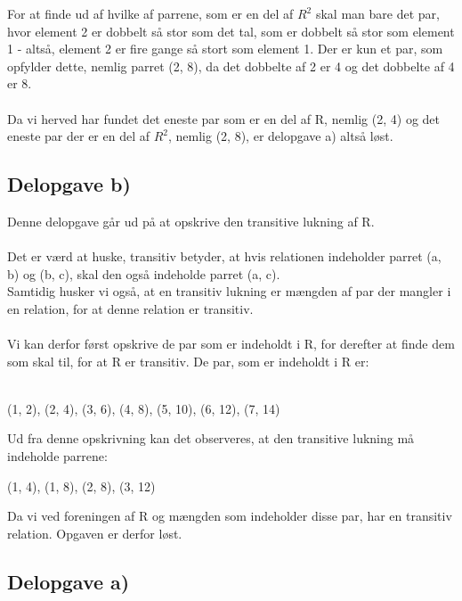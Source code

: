 \documentclass{article}
\begin{document}
For at finde ud af hvilke af parrene, som er en del af $R^2$ skal man bare det par, hvor element 2 er dobbelt så stor som det tal, som er dobbelt så stor som element 1 - altså, element 2 er fire gange så stort som element 1. Der er kun et par, som opfylder dette, nemlig parret (2, 8), da det dobbelte af 2 er 4 og det dobbelte af 4 er 8. \\ \\

Da vi herved har fundet det eneste par som er en del af R, nemlig (2, 4) og det eneste par der er en del af $R^2$, nemlig (2, 8), er delopgave a) altså løst.

\subsection{Delopgave b)}
Denne delopgave går ud på at opskrive den transitive lukning af R. \\ \\

Det er værd at huske, transitiv betyder, at hvis relationen indeholder parret (a, b) og (b, c), skal den også indeholde parret (a, c). \\ Samtidig husker vi også, at en transitiv lukning er mængden af par der mangler i en relation, for at denne relation er transitiv. \\ \\

Vi kan derfor først opskrive de par som er indeholdt i R, for derefter at finde dem som skal til, for at R er transitiv. De par, som er indeholdt i R er: \\ \\

\begin{center}
    (1, 2), (2, 4), (3, 6), (4, 8), (5, 10), (6, 12), (7, 14)
\end{center}

Ud fra denne opskrivning kan det observeres, at den transitive lukning må indeholde parrene:

\begin{center}
    (1, 4), (1, 8), (2, 8), (3, 12)
\end{center}

Da vi ved foreningen af R og mængden som indeholder disse par, har en transitiv relation. Opgaven er derfor løst.

\subsection{Delopgave a)}
\end{document}
